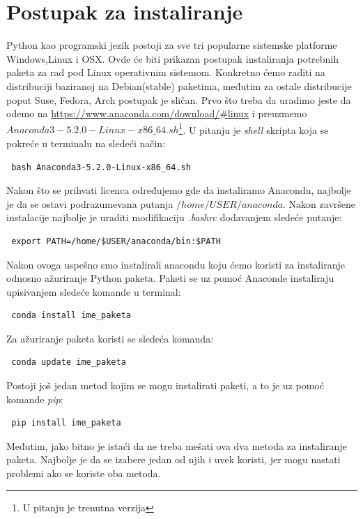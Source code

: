 \documentclass[12pt]{article}
\begin{document}
\section{Postupak za instaliranje}
Python kao programski jezik postoji za sve tri popularne sistemske platforme Windows,Linux i OSX. Ovde će biti prikazan postupak instaliranja potrebnih paketa za rad pod Linux operativnim sistemom. Konkretno ćemo raditi na distribuciji baziranoj na Debian(stable) paketima, međutim za ostale distribucije poput Suse, Fedora, Arch postupak je sličan.
Prvo što treba da uradimo jeste da odemo na \url{https://www.anaconda.com/download/#linux} i preuzmemo $Anaconda3-5.2.0-Linux-x86{\_64}.sh$\footnote{U pitanju je trenutna verzija}. U pitanju je \textsl{shell} skripta koja se pokreće u terminalu na sledeći način: 
\begin{lstlisting}
 bash Anaconda3-5.2.0-Linux-x86_64.sh
\end{lstlisting}
Nakon što se prihvati licenca određujemo gde da instaliramo Anacondu, najbolje je da se ostavi podrazumevana putanja $/home/USER/anaconda$. Nakon završene instalacije najbolje je uraditi modifikaciju \textsl{.bashrc} dodavanjem sledeće putanje:
\begin{lstlisting}
 export PATH=/home/$USER/anaconda/bin:$PATH
\end{lstlisting}
Nakon ovoga uspešno smo instalirali anacondu koju ćemo koristi za instaliranje odnosno ažuriranje Python paketa. Paketi se uz pomoć Anaconde instaliraju upisivanjem sledeće komande u terminal:
\begin{lstlisting}
 conda install ime_paketa 
\end{lstlisting}
Za ažuriranje paketa koristi se sledeća komanda:
\begin{lstlisting}
 conda update ime_paketa 
\end{lstlisting}
Postoji još jedan metod kojim se mogu instalirati paketi, a to je uz pomoć komande \textsl{pip}:
\begin{lstlisting}
 pip install ime_paketa 
\end{lstlisting}
Međutim, jako bitno je istaći da ne treba mešati ova dva metoda za instaliranje paketa. Najbolje je da se izabere jedan od njih i uvek koristi, jer mogu nastati problemi ako se koriste oba metoda. 
\end{document}
